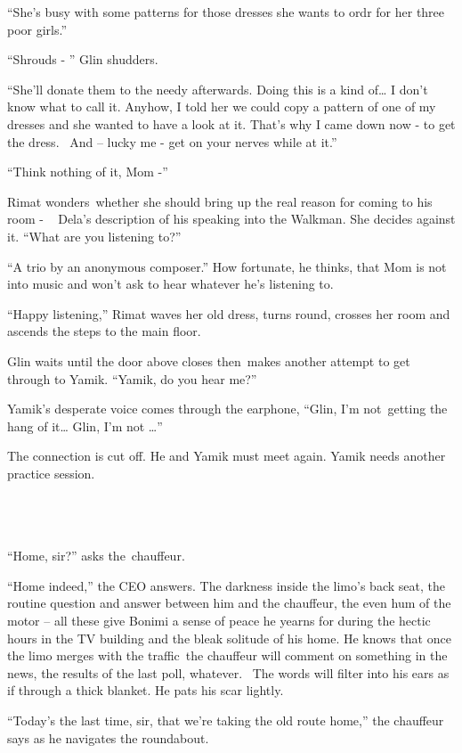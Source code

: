 \documentclass[twoside,11pt]{book}
\begin{document}
``She's busy with some patterns for those dresses she wants to ordr for her three poor
girls.''

``Shrouds - '' Glin shudders.

``She'll donate them to the needy afterwards. Doing this is a kind of{\dots} I don't know what to call it.
Anyhow, I told her we could copy a pattern of one of my dresses and she wanted to have a look at it. That's why I came
down now - to get the dress. ~And -- lucky me - get on your nerves while at it.''

``Think nothing of it, Mom -''

Rimat wonders~whether she should bring up the real reason for coming to his room - ~ Dela's description of his speaking
into the Walkman. She decides against it. ``What are you listening to?''

``A trio by an anonymous composer.'' How fortunate, he thinks, that Mom is not into music and
won't ask to hear whatever he's listening to.

``Happy listening,'' Rimat waves her old dress, turns round, crosses her room and ascends the
steps to the main floor.

Glin waits until the door above closes then~makes another attempt to get through to Yamik. ``Yamik, do you
hear me?''

Yamik's desperate voice comes through the earphone, ``Glin, I'm not~getting the hang of it{\dots} Glin, I'm
not {\dots}''

The connection is cut off. He and Yamik must meet again. Yamik needs another practice session.

~

\chapter{}

``Home, sir?'' asks the~chauffeur.

``Home indeed,'' the CEO answers. The darkness inside{ }the limo's back seat,
the routine question and answer between him and the chauffeur, the even hum of the motor -- all these give Bonimi a
sense of peace he yearns for during the hectic hours in the TV building and the{ }bleak solitude of his
home. He knows that once the limo merges with the traffic~the chauffeur will comment on something in the news, the
results of the last poll, whatever. \ The words will filter into his ears as if through a thick blanket. He pats his
scar lightly.

``Today's the last time, sir, that we're taking the old route home,'' the chauffeur says as he
navigates the roundabout.
\end{document}

